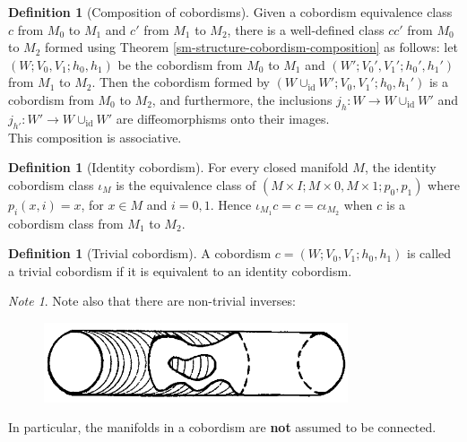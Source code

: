 \documentclass[reqno]{amsart}
\theoremstyle{definition}
\newtheorem{definition}[theorem]{Definition}
\theoremstyle{remark}
\newtheorem*{note}{Note}
\newcommand{\id}{{\mathrm{id}}}
\begin{document}
    \begin{definition}[Composition of cobordisms]
        Given a cobordism equivalence class $c$ from
        $M_0$ to $M_1$ and $c'$ from
        $M_1$ to $M_2$, there
        is a well-defined class
        $ c c'$ from $M_0$ to $M_2$ formed
        using Theorem \ref{sm-structure-cobordism-composition} as
        follows:
        let 
        $\left( W; V_0, V_1; h_0, h_1 \right) $ be
        the cobordism from $M_0$ to $M_1$ and
        $\left( W'; V_0', V_1'; h_0',h_1' \right) $ 
        from $M_1$ to $M_2$.
        Then the cobordism formed by
        $\left( W \cup_{\id} W';
        V_0, V_1'; h_0, h_1'\right) $ 
        is a cobordism from $M_0$ to $M_2$, and
        furthermore, the inclusions
        $j_h \colon W \to W \cup_{\id} W'$ and
        $j_{h'} \colon W' \to 
        W \cup_{\id}W'$ are diffeomorphisms onto
        their images.\\

        This composition is
        associative.
    \end{definition}

    \begin{definition}[Identity cobordism]
        For every closed manifold $M$, the
        identity cobordism class
        $\iota_M $ is the equivalence class of
        $\left( M \times I; M \times 0,
        M \times 1 ; p_0 , p_1\right) $ where
        $p_i (x,i) = x$, for $x \in M$ and $i = 0,1$.
        Hence
        $\iota_{M_1} c = c  = c \iota_{M_2}$ when
        $c$ is a cobordism class from $M_1$ to $M_2$.
    \end{definition}

    \begin{definition}[Trivial cobordism]
        A cobordism $c = \left( W ; V_0, V_1; h_0,h_1 \right) $ 
        is called a trivial cobordism if it is
        equivalent to an identity cobordism.
    \end{definition}

    \begin{note}
        Note also that there
        are non-trivial inverses:
        \begin{figure}[htpb]
            \centering
            \includegraphics[width=0.8\textwidth]{cobordism-example-1.png}
            \label{fig:cobordism-example-1-png}
        \end{figure}
        In particular, the manifolds in a cobordism
        are \textbf{not} assumed to be connected.
    \end{note}
\end{document}

